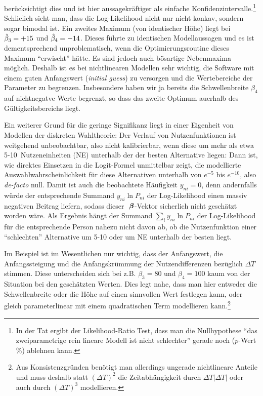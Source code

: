   ber\"ucksichtigt dies und ist
  hier aussagekr\"aftiger als einfache
  Konfidenzintervalle.\footnote{In der Tat ergibt der Likelihood-Ratio
    Test, dass man die Nullhypothese ``das zweiparametrige rein lineare
    Modell ist nicht schlechter'' gerade noch ($p$-Wert \unit[5]{\%})
    ablehnen kann.} 
\ei
Schlie\3lich sieht man, dass die Log-Likelihood nicht nur nicht
konkav, sondern sogar bimodal ist. Ein zweites Maximum (von
identischer H\"ohe) liegt bei
$\hat{\beta}_3=+15$ und $\hat{\beta}_4=-14$. Dieses f\"uhrte zu identischen
Modellaussagen und es ist dementsprechend unproblematisch, wenn die
Optimierungsroutine dieses Maximum ``erwischt'' h\"atte. Es sind jedoch auch
b\"osartige Nebenmaxima m\"oglich. Deshalb ist es bei
nichtlinearen Modellen sehr wichtig, die Software mit einem guten
Anfangswert (\emph{initial guess}) zu versorgen und die Wertebereiche
der Parameter zu begrenzen. Insbesondere haben wir ja bereits
die Schwellenbreite $\beta_4$ auf nichtnegatve Werte begrenzt, so dass
das zweite Optimum au\3erhalb des G\"ultigkeitsbereichs liegt.


Ein weiterer Grund f\"ur die geringe Signifikanz liegt in einer Eigenheit von
Modellen der diskreten Wahltheorie: Der Verlauf von Nutzenfunktionen
ist weitgehend unbeobachtbar, also nicht kalibrierbar, wenn diese um
mehr als etwa 5-10~Nutzeneinheiten (NE) 
unterhalb der der besten Alternative liegen: Dann ist, wie direktes
Einsetzen in die Logit-Formel unmittelbar zeigt,  die
modellierte Auswahlwahrscheinlichkeit f\"ur diese Alternativen
unterhalb von  $e^{-5}$ bis $e^{-10}$, also \emph{de-facto}
null. Damit ist auch die 
beobachtete H\"aufigkeit $y_{ni}=0$, denn andernfalls w\"urde der
entsprechende Summand $y_{ni}\ln P_{ni}$ der Log-Likelihood einen
massiv negativen Beitrag liefern, sodass dieser ${\mbox{ \boldmath{$\beta$}}}$-Vektor
sicherlich nicht gesch\"atzt worden w\"are. Als Ergebnis h\"angt der
Summand $\sum_i y_{ni}\ln P_{ni}$ der Log-Likelihood f\"ur die
entsprechende Person nahezu nicht davon ab, ob die Nutzenfunktion
einer ``schlechten'' Alternative um 5-10 oder um \unit[100]{NE}
unterhalb der besten liegt. 

 Im Beispiel ist im Wesentlichen nur wichtig, dass der
Anfangswert, die
Anfangssteigung und die Anfangskr\"ummung der Nutzendifferenzen
bez\"uglich $\Delta T$ stimmen. Diese unterscheiden sich bei
z.B. $\beta_3=80$ und $\beta_4=100$ kaum von der Situation bei den
gesch\"atzten Werten. Dies legt nahe, dass man hier entweder die
Schwellenbreite oder die H\"ohe auf einen sinnvollen Wert festlegen
kann, oder gleich parameterlinear mit einem quadratischen Term
modellieren kann.\footnote{Aus Konsistenzgr\"unden ben\"otigt man
  allerdings ungerade nichtlineare Anteile und muss deshalb
statt $(\Delta T)^2$ die Zeitabh\"angigkeit durch $\Delta T |\Delta T|$ oder
  auch durch $(\Delta T)^3$ modellieren.}  


